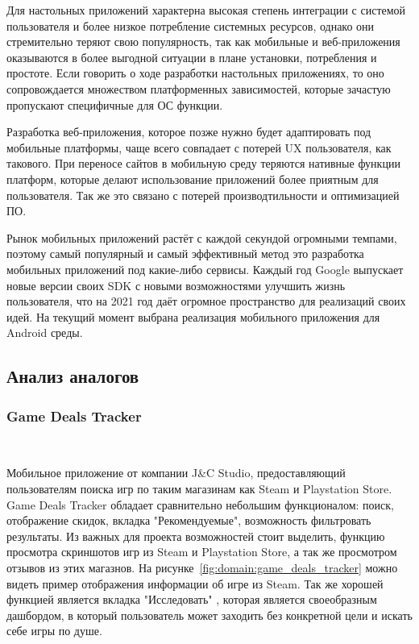 Для настольных приложений характерна высокая степень интеграции с системой пользователя и более низкое потребление системных ресурсов, однако они стремительно теряют свою популярность, так как мобильные и веб-приложения оказываются в более выгодной ситуации в плане установки, потребления и простоте. Если говорить о ходе разработки настольных приложениях, то оно сопровождается множеством платформенных зависимостей, которые зачастую пропускают специфичные для ОС функции.

Разработка веб-приложения, которое позже нужно будет адаптировать под мобильные платформы, чаще всего совпадает с потерей UX пользователя, как такового. При переносе сайтов в мобильную среду теряются нативные функции платформ, которые делают использование приложений более приятным для пользователя. Так же это связано с потерей производтильности и оптимизацией ПО.

Рынок мобильных приложений растёт с каждой секундой огромными темпами, поэтому самый популярный и самый эффективный метод это разработка мобильных приложений под какие-либо сервисы. Каждый год Google выпускает новые версии своих SDK с новыми возможностями улучшить жизнь пользователя, что на 2021 год даёт огромное пространство для реализаций своих идей. На текущий момент выбрана реализация мобильного приложения для Android среды.

\subsection{Анализ аналогов}

\subsubsection{Game Deals Tracker}~\par
Мобильное приложение от компании J\&C Studio, предоставляющий пользователям поиска игр по таким магазинам как Steam и Playstation Store. Game Deals Tracker обладает сравнительно небольшим функционалом: поиск, отображение скидок, вкладка "Рекомендуемые", возможность фильтровать результаты. Из важных для проекта возможностей стоит выделить, функцию просмотра скриншотов игр из Steam и Playstation Store, а так же просмотром отзывов из этих магазнов. На рисунке~\ref{fig:domain:game_deals_tracker} можно видеть пример отображения информации об игре из Steam. Так же хорошей функцией является вкладка "Исследовать" , которая является своеобразным дашбордом, в который пользователь может заходить без конкретной цели и искать себе игры по душе.
 
